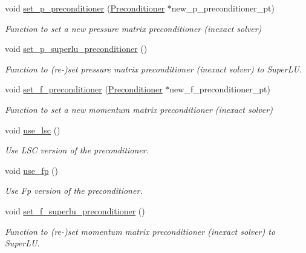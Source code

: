 \begin{DoxyCompactItemize}
\item 
void \hyperlink{classoomph_1_1NavierStokesSchurComplementPreconditioner_a48f0d5e878eccab6e7f080c92d4bc6f5}{set\+\_\+p\+\_\+preconditioner} (\hyperlink{classoomph_1_1Preconditioner}{Preconditioner} $\ast$new\+\_\+p\+\_\+preconditioner\+\_\+pt)
\begin{DoxyCompactList}\small\item\em Function to set a new pressure matrix preconditioner (inexact solver) \end{DoxyCompactList}\item 
void \hyperlink{classoomph_1_1NavierStokesSchurComplementPreconditioner_a05bac2703d9570c15bf0676cbbe7ce03}{set\+\_\+p\+\_\+superlu\+\_\+preconditioner} ()
\begin{DoxyCompactList}\small\item\em Function to (re-\/)set pressure matrix preconditioner (inexact solver) to Super\+LU. \end{DoxyCompactList}\item 
void \hyperlink{classoomph_1_1NavierStokesSchurComplementPreconditioner_ab2f387b87192dd2f7b6725cfe3aae44e}{set\+\_\+f\+\_\+preconditioner} (\hyperlink{classoomph_1_1Preconditioner}{Preconditioner} $\ast$new\+\_\+f\+\_\+preconditioner\+\_\+pt)
\begin{DoxyCompactList}\small\item\em Function to set a new momentum matrix preconditioner (inexact solver) \end{DoxyCompactList}\item 
void \hyperlink{classoomph_1_1NavierStokesSchurComplementPreconditioner_ae687961a8422c3b61da2e225c5665110}{use\+\_\+lsc} ()
\begin{DoxyCompactList}\small\item\em Use L\+SC version of the preconditioner. \end{DoxyCompactList}\item 
void \hyperlink{classoomph_1_1NavierStokesSchurComplementPreconditioner_a1f77731b78f270044f09f761719a88b0}{use\+\_\+fp} ()
\begin{DoxyCompactList}\small\item\em Use Fp version of the preconditioner. \end{DoxyCompactList}\item 
void \hyperlink{classoomph_1_1NavierStokesSchurComplementPreconditioner_af29abc6e2b9fd92ae3a31a4f9d56f6b8}{set\+\_\+f\+\_\+superlu\+\_\+preconditioner} ()
\begin{DoxyCompactList}\small\item\em Function to (re-\/)set momentum matrix preconditioner (inexact solver) to Super\+LU. \end{DoxyCompactList}\item 

\end{DoxyCompactItemize}
